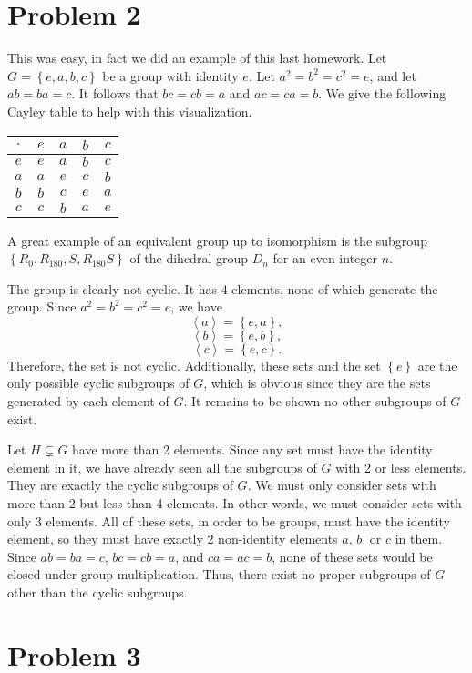 \documentclass[11pt, letterpaper]{report}
\begin{document}
\section*{Problem 2}
\begin{solution}
	This was easy, in fact we did an example of this last homework. Let $G=\left\{ e,a,b,c \right\} $ be a group with identity $e$. Let $a^2=b^2=c^2=e$, and let $ab=ba=c$. It follows that $bc=cb=a$ and $ac=ca=b$. We give the following Cayley table to help with this visualization.
	\begin{center}
	\begin{tabular}{c|cccc}
		$\cdot $ &$e$ &$a$ &$b$ &$c$ \\
		\hline
		$e$ &$e$&$a$&$b$&$c$\\
		$a$ &$a$&$e$&$c$&$b$\\
		$b$ &$b$&$c$&$e$&$a$\\
		$c$ &$c$&$b$&$a$&$e$
	\end{tabular}
	\end{center}
	A great example of an equivalent group up to isomorphism is the subgroup $\left\{ R_0,R_{180},S,R_{180}S \right\} $ of the dihedral group $D_n$ for an even integer $n$.

	The group is clearly not cyclic. It has 4 elements, none of which generate the group. Since $a^2=b^2=c^2=e$, we have
	\[
		\left<a \right> = \left\{ e,a \right\} 
	,\]
	\[
		\left<b \right> =\left\{ e,b \right\} 
	,\]
	\[
		\left<c \right> =\left\{ e,c \right\} 
	.\]
	Therefore, the set is not cyclic. Additionally, these sets and the set $\left\{ e \right\} $ are the only possible cyclic subgroups of $G$, which is obvious since they are the sets generated by each element of $G$. It remains to be shown no other subgroups of $G$ exist.

	Let $H\subsetneq G$ have more than 2 elements. Since any set must have the identity element in it, we have already seen all the subgroups of $G$ with 2 or less elements. They are exactly the cyclic subgroups of $G$. We must only consider sets with more than 2 but less than 4 elements. In other words, we must consider sets with only 3 elements. All of these sets, in order to be groups, must have the identity element, so they must have exactly 2 non-identity elements $a $, $b$, or $c$ in them. Since $ab=ba=c$, $bc=cb=a$, and $ca=ac=b$, none of these sets would be closed under group multiplication. Thus, there exist no proper subgroups of $G$ other than the cyclic subgroups.
\end{solution}
\section*{Problem 3}
\begin{solution}
	
\end{solution}
\end{document}
